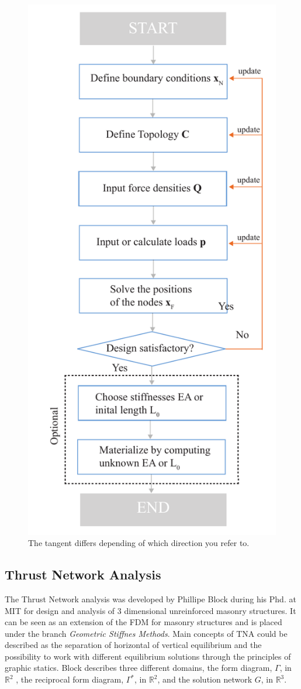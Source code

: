 \begin{figure}[H]
\centering
\includegraphics[width=0.6\linewidth ]{figure/Theory/FDScheme2.pdf}
\caption{The tangent differs depending of which direction you refer to. }
\end{figure}


\subsection{Thrust Network Analysis} \label{sec:TNA}

The Thrust Network analysis was developed by Phillipe Block during his Phd. at MIT for design and analysis of  3 dimensional unreinforced masonry structures. It can be seen as an extension of the FDM for masonry structures and is placed under the branch \textit{Geometric Stiffnes Methods}. Main concepts of TNA could be described as the separation of horizontal of vertical equilibrium and the possibility to work with different equilibrium solutions through the principles of graphic statics. Block describes three different domains, the form diagram, $\Gamma$, in $\mathbb{R}^2$  , the reciprocal form diagram, $\Gamma^*$, in $\mathbb{R}^2$,  and the solution network $G$, in $\mathbb{R}^3$.

